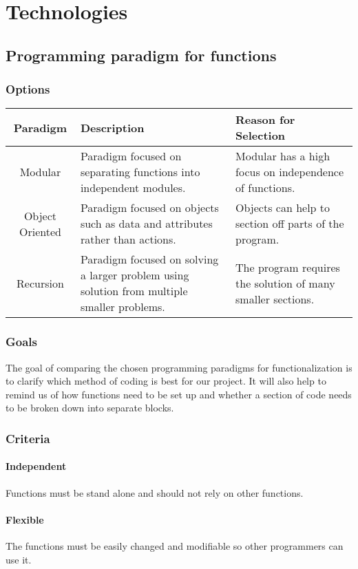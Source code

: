 \documentclass[10pt,letterpaper,onecolumn,draftclsnofoot]{IEEEtran}
\begin{document}
\section{Technologies}

\subsection{Programming paradigm for functions}
\subsubsection{Options}
\begin{center}
\begin{tabular}{ ||C|L|L|| } 
\hline
Paradigm & Description & Reason for Selection \\
 \hline
 Modular & Paradigm focused on separating functions into independent modules. & Modular has a high focus on independence of functions. \\ 
 \hline
 Object Oriented & Paradigm focused on objects such as data and attributes rather than actions. & Objects can help to section off parts of the program. \\ 
 \hline
 Recursion & Paradigm focused on solving a larger problem using solution from multiple smaller problems. & The program requires the solution of many smaller sections. \\ 
 \hline
\end{tabular}
\end{center}

\subsubsection{Goals}
The goal of comparing the chosen programming paradigms for functionalization is to clarify which method of coding is best for our project. It will also help to remind us of how functions need to be set up and whether a section of code needs to be broken down into separate blocks.

\subsubsection{Criteria}
\paragraph{Independent}
Functions must be stand alone and should not rely on other functions.

\paragraph{Flexible}
The functions must be easily changed and modifiable so other programmers can use it.
\end{document}
